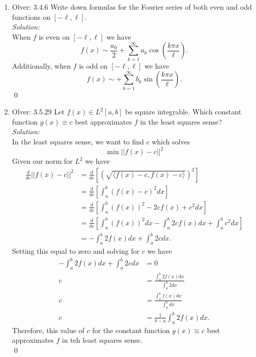 \documentclass[10pt]{amsart}
\theoremstyle{nonumberplain}
\begin{document}
\begin{enumerate}[label={\bf {\arabic*}:}]
\begin{enumerate}
\end{enumerate}

\newpage


\item Olver: 3.4.6 Write down formulas for the Fourier series of both even and odd functions on $[-\ell, \ell]$. \\

\noindent
\textit{Solution:} \\
When $f$ is even on $[-\ell, \ell]$ we have
$$
f(x) \sim \frac {a_0} 2 + \sum_{k=1}^{\infty} a_k \cos \left( \frac {k \pi x }{\ell} \right).
$$
Additionally, when $f$ is odd on $[-\ell, \ell]$ we have
$$
f(x) \sim + \sum_{k=1}^{\infty} b_k \sin \left( \frac {k \pi x }{\ell} \right).
$$
\qed \\

\newpage


\item Olver: 3.5.29 Let $f(x) \in L^2[a, b]$ be square integrable.
Which constant function $g(x) \equiv c$ best approximates $f$ in the least squares sense? \\

\noindent
\textit{Solution:} \\
In the least squares sense, we want to find $c$ which solves
$$
\min || f(x) - c||^2
$$
Given our norm for $L^2$ we have
\begin{align*}
\frac d {dc} || f(x) - c||^2 &= \frac d {dc} \left[ \left( \sqrt{ \langle f(x) - c, f(x) - c \rangle } \right)^2 \right] \\
	&= \frac d {dc} \left[ \int_a^b (f(x) - c)^2 dx \right] \\
	&= \frac d {dc} \left[ \int_a^b (f(x))^2 - 2cf(x) + c^2 dx \right] \\
	&= \frac d {dc} \left[ \int_a^b (f(x))^2 dx - \int_a^b 2cf(x) dx + \int_a^b c^2 dx \right] \\
	&= - \int_a^b 2f(x) dx + \int_a^b 2c dx.
\end{align*}
Setting this equal to zero and solving for $c$ we have
\begin{align*}
- \int_a^b 2f(x) dx + \int_a^b 2c dx &= 0 \\
c &= \frac {\int_a^b 2f(x) dx}{\int_a^b 2 dx} \\
c &= \frac {\int_a^b f(x) dx}{\int_a^b dx} \\
c &= \frac 1 {b - a} \int_a^b 2f(x) dx.
\end{align*}
Therefore, this value of $c$ for the constant function $g(x) \equiv c$ best approximates $f$ in teh least squares sense. \\
\qed \\


\end{enumerate}
\end{document}
